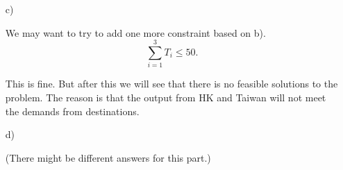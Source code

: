 \documentclass[12pt]{article}
\begin{document}
\begin{enumerate}
\item[c)]

We may want to try to add one more constraint based on b).
$$
\sum_{i = 1}^3 T_i \leqslant 50.
$$

This is fine. But after this we will see that there is no feasible solutions to the problem. The reason is that the output from HK and Taiwan will not meet the demands from destinations.



\item[d)]

(There might be different answers for this part.)









\end{enumerate}
\end{document}
